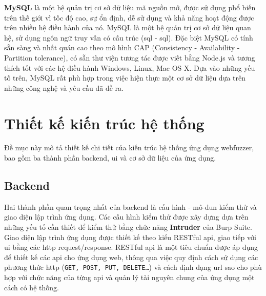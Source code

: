 \textbf{MySQL} là một hệ quản trị cơ sở dữ liệu mã nguồn mở, được sử dụng phổ biến trên thế giới vì tốc độ cao, sự ổn định, dễ sử dụng và khả năng hoạt động được trên nhiều hệ điều hành của nó. MySQL là một hệ quản trị cơ sở dữ liệu quan hệ, sử dụng ngôn ngữ truy vấn có cấu trúc (\acrlong{sql} - \acrshort{sql}). Đặc biệt MySQL có tính sẵn sàng và nhất quán cao theo mô hình CAP (Consistency - Availability - Partition tolerance), có sẵn thư viện tương tác được viết bằng Node.js và tương thích tốt với các hệ điều hành Windows, Linux, Mac OS X. Dựa vào những yếu tố trên, MySQL rất phù hợp trong việc hiện thực một cơ sở dữ liệu dựa trên những công nghệ và yêu cầu đã đề ra.
\section{Thiết kế kiến trúc hệ thống}
Đề mục này mô tả thiết kế chi tiết của kiến trúc hệ thống ứng dụng webfuzzer, bao gồm ba thành phần backend, \acrshort{ui} và cơ sở dữ liệu của ứng dụng.
\subsection{Backend}
Hai thành phần quan trọng nhất của backend là cấu hình - mô-đun kiểm thử và giao diện lập trình ứng dụng. Các cấu hình kiểm thử được xây dựng dựa trên những yếu tố cần thiết để kiểm thử bằng chức năng \textbf{Intruder} của Burp Suite. Giao diện lập trình ứng dụng được thiết kế theo kiểu RESTful \acrshort{api}, giao tiếp với \acrshort{ui} bằng các \acrshort{http} request/response. RESTful \acrshort{api} là một tiêu chuẩn được áp dụng để thiết kế các \acrshort{api} cho ứng dụng web, thông qua việc quy định cách sử dụng các phương thức \acrshort{http} (\texttt{GET, POST, PUT, DELETE…}) và cách định dạng \acrshort{url} sao cho phù hợp với chức năng của từng \acrshort{api} và quản lý tài nguyên chung của ứng dụng một cách có hệ thống.
